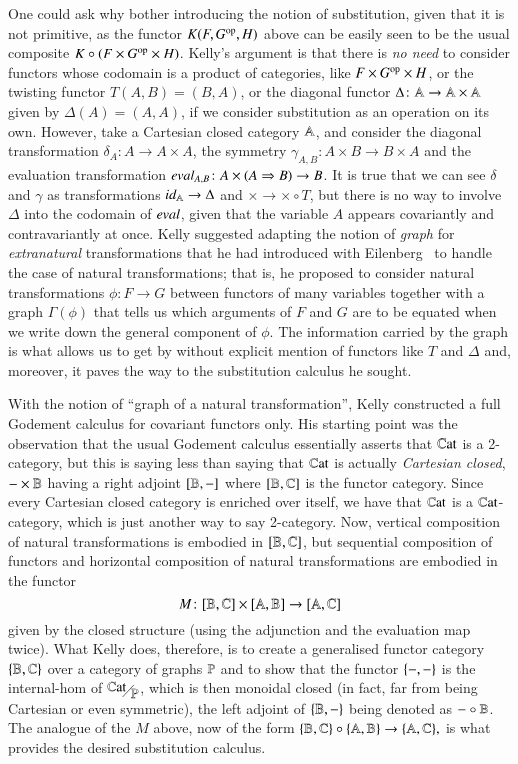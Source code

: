 One could ask why bother introducing the notion of substitution, given that it is not primitive, as the functor  $K(F,G^{\text{op}}, H)$ above can be easily seen to be the usual composite $K \circ (F \times G^{\text{op}} \times H)$. Kelly's argument is that there is \emph{no need} to consider functors whose codomain is a product of categories, like $F \times G^{\text{op}} \times H$, or the twisting functor $T(A,B) = (B,A)$, or the diagonal functor $\Delta \colon \mathbb A \to \mathbb A \times \mathbb A$ given by $\Delta(A) = (A,A)$, if we consider substitution as an operation on its own. However, take a Cartesian closed category $\mathbb A$, and consider the diagonal transformation $\delta_A \colon A \to A \times A$, the symmetry $\gamma_{A,B} \colon A \times B \to B \times A$ and the evaluation transformation $\eval A B \colon A \times (A \implies B) \to B$. It is true that we can see $\delta$ and $\gamma$ as transformations $\mathop{\textit{id}_{\mathbb A}} \to \Delta$ and $\times \to \times \circ T$, but there is no way to involve $\Delta$ into the codomain of $\eval{}{}$, given that the variable $A$ appears covariantly and contravariantly at once. Kelly suggested adapting the notion of \emph{graph} for \emph{extranatural} transformations that he had introduced with Eilenberg~\cite{eilenberg_generalization_1966} to handle the case of natural transformations; that is, he proposed to consider natural transformations $\phi \colon F \to G$ between functors of many variables together with a graph $\Gamma(\phi)$ that tells us which arguments of $F$ and $G$ are to be equated when we write down the general component of $\phi$. The information carried by the graph is what allows us to get by without explicit mention of functors like $T$ and $\Delta$ and, moreover, it paves the way to the substitution calculus he sought.

With the notion of ``graph of a natural transformation'', Kelly constructed a full Godement calculus for covariant functors only. His starting point was the observation that the usual Godement calculus essentially asserts that $\mathbb{C}\mathrm{at}$ is a 2-category, but this is saying less than saying that $\mathbb{C}\mathrm{at}$ is actually \emph{Cartesian closed}, $- \times \mathbb B$ having a right adjoint $[\mathbb B,-]$ where $[\mathbb B,\mathbb C]$ is the functor category. Since every Cartesian closed category is enriched over itself, we have that $\mathbb{C}\mathrm{at}$ is a $\mathbb{C}\mathrm{at}$-category, which is just another way to say 2-category. Now, vertical composition of natural transformations is embodied in $[\mathbb B,\mathbb C]$, but sequential composition of functors and horizontal composition of natural transformations are embodied in the functor
\[
M \colon [\mathbb B,\mathbb C] \times [\mathbb A,\mathbb B] \to [\mathbb A,\mathbb C]
\]
given by the closed structure (using the adjunction and the evaluation map twice). What Kelly does, therefore, is to create a generalised functor category $\{ \mathbb B,\mathbb C\} $ over a category of graphs $\mathbb P$ and to show that the functor $\{ -,-\}$ is the internal-hom of $\catover\Per$, which is then monoidal closed (in fact, far from being Cartesian or even symmetric), the left adjoint of $\{ \mathbb B,-\}$ being denoted as $- \circ \mathbb B$. The analogue of the $M$ above, now of the form $\{ \mathbb B,\mathbb C\} \circ \{ \mathbb A,\mathbb B\} \to \{ \mathbb A,\mathbb C\},$ is what provides the desired substitution calculus.

